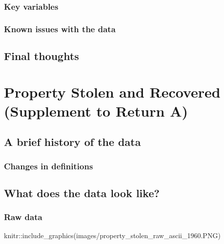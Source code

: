 \documentclass[
  12pt,
  openany]{book}
\newenvironment{Shaded}{\begin{snugshade}}{\end{snugshade}}
\newcommand{\FunctionTok}[1]{\textcolor[rgb]{0,0,0}{#1}}
\newcommand{\NormalTok}[1]{#1}
\newcommand{\SpecialCharTok}[1]{\textcolor[rgb]{0,0,0}{#1}}
\newcommand{\StringTok}[1]{\textcolor[rgb]{0.5,0.5,0.5}{#1}}
\begin{document}
\hypertarget{key-variables-4}{%
\subsection{Key variables}\label{key-variables-4}}

\hypertarget{known-issues-with-the-data-4}{%
\subsection{Known issues with the data}\label{known-issues-with-the-data-4}}

\hypertarget{final-thoughts-4}{%
\section{Final thoughts}\label{final-thoughts-4}}

\hypertarget{stolen_property}{%
\chapter{Property Stolen and Recovered (Supplement to Return A)}\label{stolen_property}}

\hypertarget{a-brief-history-of-the-data-5}{%
\section{A brief history of the data}\label{a-brief-history-of-the-data-5}}

\hypertarget{changes-in-definitions-5}{%
\subsection{Changes in definitions}\label{changes-in-definitions-5}}

\hypertarget{what-does-the-data-look-like-5}{%
\section{What does the data look like?}\label{what-does-the-data-look-like-5}}

\hypertarget{raw-data-5}{%
\subsection{Raw data}\label{raw-data-5}}

\begin{Shaded}
\begin{Highlighting}[]
\NormalTok{knitr}\SpecialCharTok{::}\FunctionTok{include\_graphics}\NormalTok{(}\StringTok{\textquotesingle{}images/property\_stolen\_raw\_ascii\_1960.PNG\textquotesingle{}}\NormalTok{)}
\end{Highlighting}
\end{Shaded}
\end{document}
